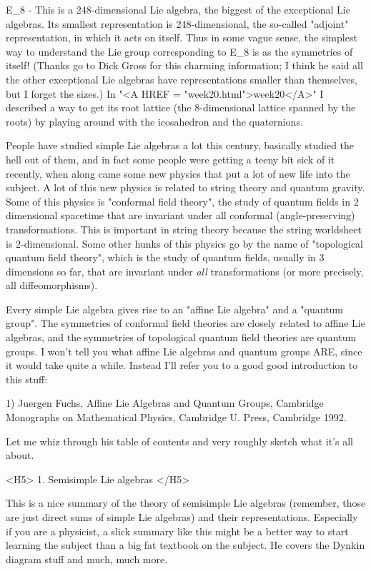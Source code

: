 E_{8} - This is a 248-dimensional Lie algebra, the biggest
of the exceptional Lie algebras.  Its smallest representation is
248-dimensional, the so-called "adjoint" representation, in which it
acts on itself.  Thus in some vague sense, the simplest way to
understand the Lie group corresponding to E_{8} is as the
symmetries of itself!  (Thanks go to Dick Gross for this charming
information; I think he said all the other exceptional Lie algebras
have representations smaller than themselves, but I forget the sizes.)
In "<A HREF = "week20.html">week20</A>" I described a way to get its
root lattice (the 8-dimensional lattice spanned by the roots) by
playing around with the icosahedron and the quaternions.

People have studied simple Lie algebras a lot this century, basically
studied the hell out of them, and in fact some people were getting a
teeny bit sick of it recently, when along came some new physics that put
a lot of new life into the subject.  A lot of this new physics is
related to string theory and quantum gravity.  Some of this physics is
"conformal field theory", the study of quantum fields in 2 dimensional
spacetime that are invariant under all conformal (angle-preserving)
transformations.  This is important in string theory because the string
worldsheet is 2-dimensional.  Some other hunks of this physics go by the
name of "topological quantum field theory", which is the study of
quantum fields, usually in 3 dimensions so far, that are invariant under
\emph{all} transformations (or more precisely, all diffeomorphisms).

Every simple Lie algebra gives rise to an "affine Lie algebra" and
a "quantum group".   The symmetries of conformal field theories are
closely related to affine Lie algebras, and the symmetries of
topological quantum field theories are quantum groups.  I won't
tell you what affine Lie algebras and quantum groups ARE, since it
would take quite a while.  Instead I'll refer you to a good
good introduction to this stuff:  

1) Juergen Fuchs, Affine Lie Algebras and Quantum Groups, Cambridge
Monographs on Mathematical Physics, Cambridge U. Press, Cambridge 1992.

Let me whiz through his table of contents and very roughly sketch what
it's all about.

<H5> 1.  Semisimple Lie algebras </H5>

This is a nice summary of the theory of semisimple Lie algebras
(remember, those are just direct sums of simple Lie algebras) and their
representations.  Especially if you are a physicist, a slick summary
like this might be a better way to start learning the subject than a big
fat textbook on the subject.  He covers the Dynkin diagram stuff and
much, much more.  

